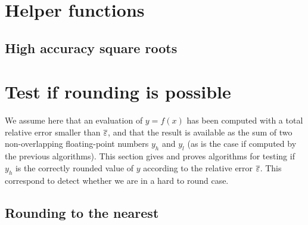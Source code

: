 \section{Helper functions \label{section:helperfunctions}}

\subsection{High accuracy square roots \label{subsection:sqrt}}




\section{Test if rounding is possible
\label{section:testrounding}}

We assume here that an evaluation of $y=f(x)$ has been computed with a
total relative error smaller than ${\overline{\varepsilon}}$, and that the result is
available as the sum of two non-overlapping floating-point numbers
$y_h$ and $y_l$ (as is the case if computed by the previous
algorithms). This section gives and proves algorithms for testing if
$y_h$ is the correctly rounded value of $y$ according to the relative
error ${\overline{\varepsilon}}$. This correspond to detect whether we are in a hard
to round case.




\subsection{Rounding to the nearest}

